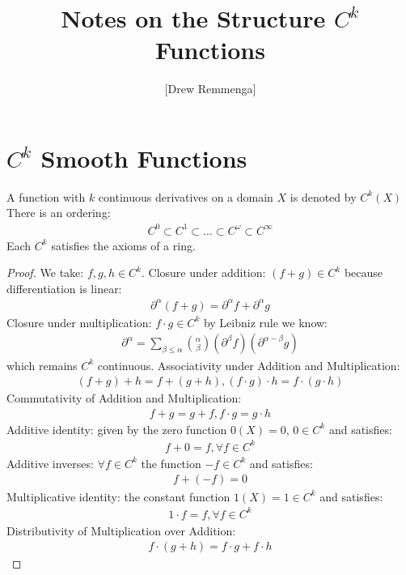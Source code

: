 \documentclass[10pt, oneside]{article}
\title{Notes on the Structure $C^k$ Functions}
\author{[Drew Remmenga]}
\begin{document}
\maketitle
\begin{abstract}
\end{abstract}
\section*{$C^k$ Smooth Functions}
  A function with $k$ continuous derivatives on a domain $X$ is denoted by $C^k(X)$ \cite{Lang1999}
  There is an ordering:
  \begin{align*}
     C^0 \subset C^1 \subset \dots \subset C^{\omega} \subset C^{\infty}
  \end{align*}
  Each $C^k$ satisfies the axioms of a ring.
  \begin{proof}
     We take: $f, g, h \in C^k$.
     Closure under addition: $(f+g) \in C^k$ because differentiation is linear:
     \begin{align*}
        \partial^\alpha (f+g) = \partial^\alpha f + \partial^\alpha g
     \end{align*}
     Closure under multiplication: $f \cdot g \in C^k$ by Leibniz rule we know:
     \begin{align*}
        \partial^\alpha = \sum_{\beta \leq \alpha} {\alpha \choose \beta} (\partial^{\beta} f)(\partial^{\alpha - \beta}g)
     \end{align*}
     which remains $C^k$ continuous.
     Associativity under Addition and Multiplication:
     \begin{align*}
        (f+g)+h = f+(g+h), (f\cdot g)\cdot h = f\cdot (g \cdot h)
     \end{align*}
     Commutativity of Addition and Multiplication:
     \begin{align*}
        f+g=g+f, f\cdot g = g\cdot h
     \end{align*}
     Additive identity: given by the zero function $0(X) = 0$, $0 \in C^k$ and satisfies:
     \begin{align*}
        f+0=f, \forall f \in C^k
     \end{align*}
     Additive inverses: $\forall f \in C^k$ the function $-f \in C^k$ and satisfies:
     \begin{align*}
        f+(-f) = 0
     \end{align*}
     Multiplicative identity: the constant function $1(X) = 1 \in C^k$ and satisfies:
     \begin{align*}
        1 \cdot f = f, \forall f \in C^k
     \end{align*}
     Distributivity of Multiplication over Addition:
     \begin{align*}
        f \cdot (g + h) = f \cdot g + f \cdot h
     \end{align*}
  \end{proof}
\end{document}

